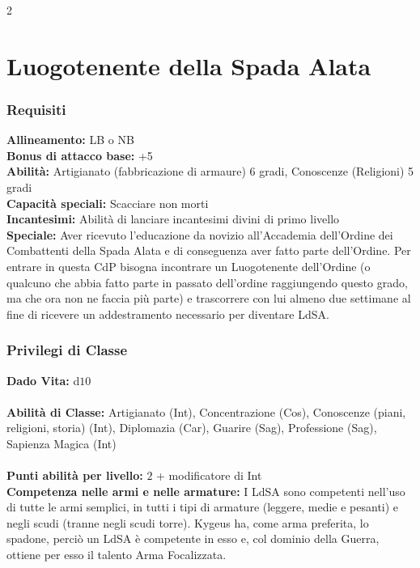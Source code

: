 \documentclass[10pt, a4paper]{report}
\begin{document}
\newpage
\begin{multicols}{2}

\section{Luogotenente della Spada Alata}

\subsubsection*{Requisiti}
\textbf{Allineamento:} LB o NB\\
\textbf{Bonus di attacco base:} +5\\
\textbf{Abilità:} Artigianato (fabbricazione di armaure) 6 gradi, Conoscenze (Religioni) 5 gradi\\
\textbf{Capacità speciali:} Scacciare non morti\\
\textbf{Incantesimi:} Abilità di lanciare incantesimi divini di primo livello\\
\textbf{Speciale:} Aver ricevuto l’educazione da novizio all’Accademia dell’Ordine dei Combattenti della Spada Alata e di conseguenza aver fatto parte dell’Ordine. Per entrare in questa CdP bisogna incontrare un Luogotenente dell’Ordine (o qualcuno che abbia fatto parte in passato dell’ordine raggiungendo questo grado, ma che ora non ne faccia più parte) e trascorrere con lui almeno due settimane al fine di ricevere un addestramento necessario per diventare LdSA.\\
\subsubsection*{Privilegi di Classe}
\textbf{Dado Vita:} d$10$\\
\\
\textbf{Abilità di Classe:} Artigianato (Int), Concentrazione (Cos), Conoscenze (piani, religioni, storia) (Int), Diplomazia (Car), Guarire (Sag), Professione (Sag), Sapienza Magica (Int)\\
\\
\textbf{Punti abilità per livello:} $2$ + modificatore di Int\\

\textbf{Competenza nelle armi e nelle armature:} I LdSA sono competenti nell’uso di tutte le armi semplici, in tutti i tipi di armature (leggere, medie e pesanti) e negli scudi (tranne negli scudi torre). Kygeus ha, come arma preferita, lo spadone, perciò un LdSA è competente in esso e, col dominio della Guerra, ottiene per esso il talento Arma Focalizzata.\\


\end{multicols}
\end{document}
